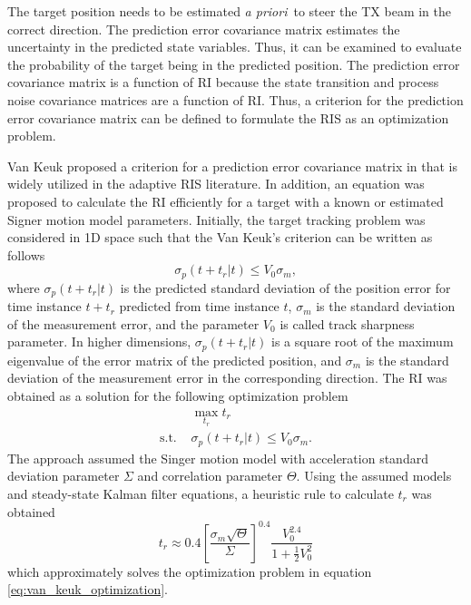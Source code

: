 \documentclass[english, 12pt, a4paper, elec, utf8, a-1b, online]{aaltothesis}
\numberwithin{equation}{section}
\def\prior{\textit{a priori}\ }
\newcommand{\ri}{t_r}
\begin{document}
\newcommand{\ndwells}{{n_d}}


The target position needs to be estimated \prior to steer the TX beam in the correct direction. 
The prediction error covariance matrix estimates the uncertainty in the predicted state variables.
Thus, it can be examined to evaluate the probability of the target being in the predicted position.
The prediction error covariance matrix is a function of RI because the state transition and process noise covariance matrices are a function of RI.
Thus, a criterion for the prediction error covariance matrix can be defined to formulate the RIS as an optimization problem.

Van Keuk proposed a criterion for a prediction error covariance matrix in \cite{Keuk1975} that is widely utilized in the adaptive RIS literature.
In addition, an equation was proposed to calculate the RI efficiently for a target with a known or estimated Signer motion model \cite{RongLi2003} parameters.
Initially, the target tracking problem was considered in 1D space such that the Van Keuk's criterion can be written as follows
\begin{equation}\label{eq:criterion}
    \sigma_p(t + \ri | t) \leq V_0 \sigma_m,
\end{equation}
where $\sigma_p(t + \ri | t)$ is the predicted standard deviation of the position error for time instance $t+\ri$ predicted from time instance $t$, $\sigma_m$ is the standard deviation of the measurement error, and the parameter $V_0$ is called track sharpness parameter.
In higher dimensions, $\sigma_p(t + \ri | t)$ is a square root of the maximum eigenvalue of the error matrix of the predicted position, and $\sigma_m$ is the standard deviation of the measurement error in the corresponding direction.
The RI was obtained as a solution for the following optimization problem
\begin{equation}\label{eq:van_keuk_optimization}
\begin{array}{ll}
     & \max_{\ri} \ri \\[7pt]
    \text{s.t. } &\sigma_p(t + \ri | t) \leq V_0 \sigma_m. 
\end{array}
\end{equation}
The approach assumed the Singer motion model with acceleration standard deviation parameter $\Sigma$ and correlation parameter $\Theta$.
Using the assumed models and steady-state Kalman filter equations, a heuristic rule to calculate $\ri$ was obtained
\begin{equation}\label{eq:keuk_time}
    \ri \approx 0.4 \left[ \frac{\sigma_m \sqrt{\Theta}}{\Sigma} \right]^{0.4} \frac{V_0^{2.4}}{1+\frac{1}{2}V_0^2}
\end{equation}
which approximately solves the optimization problem in equation \eqref{eq:van_keuk_optimization}.
\end{document}
